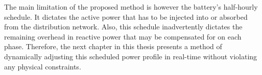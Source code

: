 The main limitation of the proposed method is however the battery's half-hourly schedule.
It dictates the active power that has to be injected into or absorbed from the distribution network.
Also, this schedule inadvertently dictates the remaining overhead in reactive power that may be compensated for on each phase.
Therefore, the next chapter in this thesis presents a method of dynamically adjusting this scheduled power profile in real-time without violating any physical constraints.
